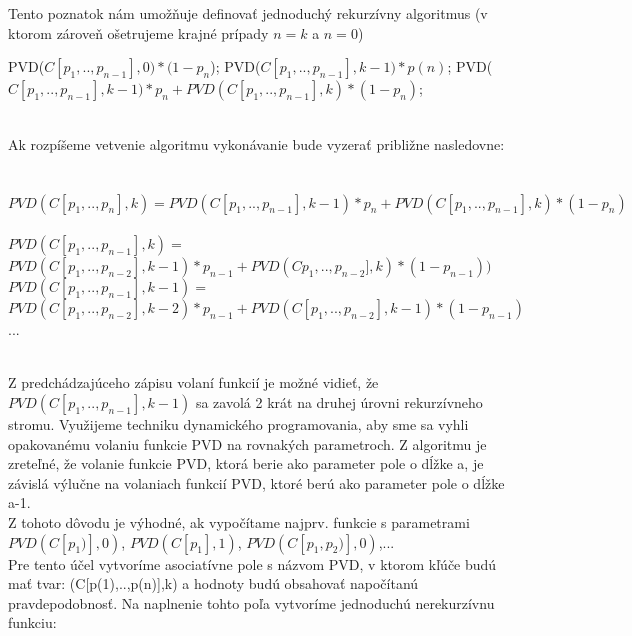 \documentclass[paper=a4, fontsize=11pt]{scrartcl} %
\numberwithin{equation}{section} %
\numberwithin{figure}{section} %
\numberwithin{table}{section} %
\begin{document}
Tento poznatok nám umožňuje definovať jednoduchý rekurzívny algoritmus (v ktorom zároveň ošetrujeme krajné prípady $n=k$ a $n=0$) \ \\

\begin{algorithmic}[1]
            \State \Return PVD($C[{p}_1,..,{p}_{n-1}],0)*(1-{p}_n$);
        \EndIf
            \State \Return PVD($C[{p}_1,..,{p}_{n-1}],k-1)*p(n)$;
        \EndIf
        \State \Return PVD($C[{p}_1,..,{p}_{n-1}],k-1)*{p}_{n} + PVD(C[{p}_1,..,{p}_{n-1}],k)*(1-{p}_{n})$;
    \EndFunction
\end{algorithmic}
\ \\

Ak rozpíšeme vetvenie algoritmu vykonávanie bude vyzerať približne nasledovne: \ \\ \ \\
$PVD(C[{p}_1,..,{p}_n],k) = PVD(C[{p}_1,..,{p}_{n-1}],k-1)*{p}_n + PVD(C[{p}_1,..,{p}_{n-1}],k)*(1-{p}_n)$ \ \\

$PVD(C[{p}_1,..,{p}_{n-1}],k) = $ \ \\
	$         PVD(C[{p}_1,..,{p}_{n-2}],k-1)*{p}_{n-1} + PVD(C{p}_1,..,{p}_{n-2}],k)*(1-{p}_{n-1}))$ \ \\

$PVD(C[{p}_1,..,{p}_{n-1}],k-1) = $ \\ 
	$         PVD(C[{p}_1,..,{p}_{n-2}],k-2)*{p}_{n-1} + PVD(C[{p}_1,..,{p}_{n-2}],k-1)*(1-{p}_{n-1})$
...

\ \\ 

Z predchádzajúceho zápisu volaní funkcií je možné vidieť, že $PVD(C[{p}_1,..,{p}_{n-1}],k-1) $ sa zavolá 2 krát na druhej úrovni rekurzívneho stromu.
Využijeme techniku dynamického programovania, aby sme sa vyhli opakovanému volaniu funkcie PVD na rovnakých parametroch.
Z algoritmu je zreteľné, že volanie funkcie PVD, ktorá berie ako parameter pole o dĺžke a, je závislá výlučne na volaniach funkcií PVD, ktoré berú ako parameter pole o dĺžke a-1. \ \\

Z tohoto dôvodu je výhodné, ak vypočítame najprv. funkcie s parametrami $PVD(C[{p}_{1})],0)$, $PVD(C[{p}_{1}],1)$, $PVD(C[p_1,p_2)],0)$,... \ \\
 

Pre tento účel vytvoríme asociatívne pole s názvom PVD, v ktorom kľúče budú mať tvar:
(C[p(1),..,p(n)],k)
a hodnoty budú obsahovať napočítanú pravdepodobnosť.
Na naplnenie tohto poľa vytvoríme jednoduchú nerekurzívnu funkciu:
\end{document}
